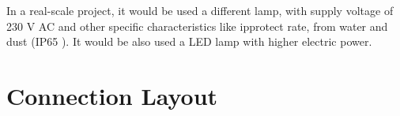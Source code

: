 In a real-scale project, it would be used a different lamp, with supply voltage of 230 V AC and other specific characteristics  like \ac{ipprotect} rate, from water and dust (IP65 \cite{ip65}). It would be also used a LED lamp with higher electric power. 

\section{Connection Layout} %

